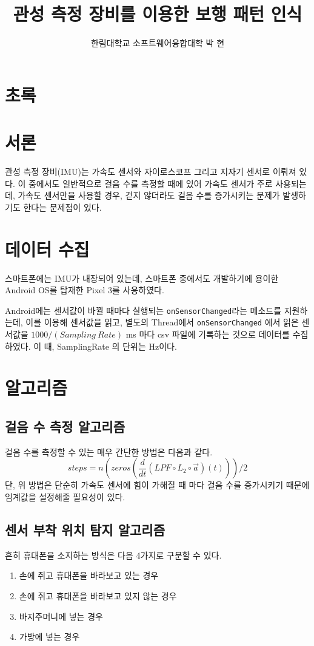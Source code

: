 \documentclass[10pt, twocolumn]{article}
\title{관성 측정 장비를 이용한 보행 패턴 인식}
\author{한림대학교 소프트웨어융합대학 박 현}
\date{}
\begin{document}
	\maketitle
	\section*{초록}
    
    \section{서론}
    \hspace{\parindent} 관성 측정 장비(IMU)는 가속도 센서와 자이로스코프 그리고 지자기 센서로 이뤄져 있다.
    이 중에서도 일반적으로 걸음 수를 측정할 때에 있어 가속도 센서가 주로 사용되는데, 가속도 센서만을 사용할 경우,
    걷지 않더라도 걸음 수를 증가시키는 문제가 발생하기도 한다는 문제점이 있다.

    \section{데이터 수집}
    \hspace{\parindent} 스마트폰에는 IMU가 내장되어 있는데, 스마트폰 중에서도 개발하기에 용이한 Android OS를 탑재한 Pixel 3를 사용하였다.
    
    Android에는 센서값이 바뀔 때마다 실행되는 \texttt{onSensorChanged}라는 메소드를 지원하는데, 이를 이용해 센서값을 읽고,
    별도의 Thread에서 \texttt{onSensorChanged} 에서 읽은 센서값을 $1000/(Sampling\ Rate)$ ms 마다 csv 파일에 기록하는 것으로
    데이터를 수집하였다. 이 때, SamplingRate 의 단위는 Hz이다.



    \section{알고리즘}
    \subsection{걸음 수 측정 알고리즘}
    \hspace{\parindent} 걸음 수를 측정할 수 있는 매우 간단한 방법은 다음과 같다.
    \begin{equation}
        steps = n(zeros(\frac{d}{dt}(LPF \circ L_2 \circ \vec{a})(t)))/2  
    \end{equation}
    \hspace{\parindent} 단, 위 방법은 단순히 가속도 센서에 힘이 가해질 때 마다 걸음 수를 증가시키기 때문에
    임계값을 설정해줄 필요성이 있다.
    
    \subsection{센서 부착 위치 탐지 알고리즘}
    흔히 휴대폰을 소지하는 방식은 다음 4가지로 구분할 수 있다.
    \begin{enumerate}
        \item 손에 쥐고 휴대폰을 바라보고 있는 경우
        \item 손에 쥐고 휴대폰을 바라보고 있지 않는 경우
        \item 바지주머니에 넣는 경우
        \item 가방에 넣는 경우
    \end{enumerate}
\end{document}
